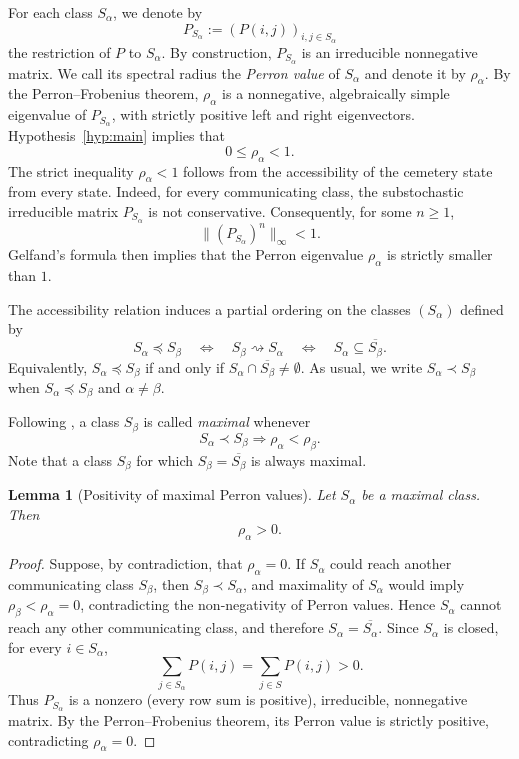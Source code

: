 \documentclass[10pt,letterpaper]{article}
\theoremstyle{compactplain}
\newtheorem{lemma}[theorem]{Lemma}
\theoremstyle{compactdefinition}
\newcommand{\1}{\mathds{1}}
\begin{document}
For each class \(S_\alpha\), we denote by
\[
P_{S_\alpha}:=(P(i,j))_{i,j\in S_\alpha}
\]
the restriction of \(P\) to \(S_\alpha\). By construction, \(P_{S_\alpha}\) is an irreducible nonnegative matrix. We call its spectral radius the \emph{Perron value} of \(S_\alpha\) and denote it by \(\rho_\alpha\). By the Perron--Frobenius theorem, \(\rho_\alpha\) is a nonnegative, algebraically simple eigenvalue of \(P_{S_\alpha}\), with strictly positive left and right eigenvectors. Hypothesis~\ref{hyp:main} implies that
\[
0\leq \rho_\alpha<1.
\]
The strict inequality \(\rho_\alpha<1\) follows from the accessibility of the cemetery state from every state. Indeed, for every communicating class, the substochastic irreducible matrix \(P_{S_\alpha}\) is not conservative. Consequently, for some \(n\geq1\),
\[
\|(P_{S_\alpha})^n\|_\infty<1.
\]
Gelfand's formula then implies that the Perron eigenvalue \(\rho_\alpha\) is strictly smaller than \(1\).






\medskip


The accessibility relation induces a partial ordering on the classes $(S_\alpha)$ defined by
\[
S_\alpha\preccurlyeq S_\beta
\quad\Longleftrightarrow\quad
S_\beta\rightsquigarrow S_\alpha
\quad\Longleftrightarrow\quad
S_\alpha\subseteq\overline{S_\beta}.
\]
Equivalently, $S_\alpha\preccurlyeq S_\beta$ if and only if $S_\alpha\cap \overline{S_\beta}\neq\emptyset$. As usual, we write $S_\alpha\prec S_\beta$ when $S_\alpha\preccurlyeq S_\beta$ and $\alpha\neq \beta$.

\medskip

Following \cite{pollett2008quasi}, a class $S_\beta$ is called \emph{maximal} whenever
\[
S_\alpha\prec S_\beta \Rightarrow \rho_\alpha<\rho_\beta.
\]
Note that a class $S_\beta$ for which $S_\beta=\overline{S_\beta}$ is always maximal. 
\begin{lemma}[Positivity of maximal Perron values]
\label{lem:positive-maximal-rho}
Let \(S_\alpha\) be a maximal class. Then
\[
\rho_\alpha>0.
\]
\end{lemma}
\begin{proof}
Suppose, by contradiction, that \(\rho_\alpha=0\). If \(S_\alpha\) could reach
another communicating class \(S_\beta\), then \(S_\beta\prec S_\alpha\), and
maximality of \(S_\alpha\) would imply \(\rho_\beta<\rho_\alpha=0\), contradicting the non-negativity of Perron values. Hence \(S_\alpha\) cannot
reach any other communicating class, and therefore
\(
S_\alpha=\overline{S_\alpha}.
\) Since \(S_\alpha\) is closed, for every \(i\in S_\alpha\),
\[
\sum_{j\in S_\alpha}P(i,j)
=
\sum_{j\in S}P(i,j)
>0.
\]
Thus \(P_{S_\alpha}\) is a nonzero (every row sum is positive), irreducible, nonnegative matrix. By the
Perron--Frobenius theorem, its Perron value is strictly positive, contradicting
\(\rho_\alpha=0\).
\end{proof}
\end{document}
